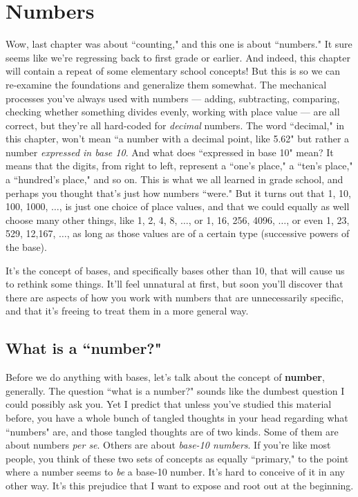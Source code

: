 
\chapter{Numbers}

Wow, last chapter was about ``counting," and this one is about ``numbers."
It sure seems like we're regressing back to first grade or earlier. And
indeed, this chapter will contain a repeat of some elementary school
concepts! But this is so we can re-examine the foundations and generalize
them somewhat. The mechanical processes you've always used with numbers ---
adding, subtracting, comparing, checking whether something divides evenly,
working with place value --- are all correct, but they're all hard-coded
for \textit{decimal} numbers. The word ``decimal," in this chapter, won't
mean ``a number with a decimal point, like 5.62" but rather a number
\textit{expressed in base 10}. And what does ``expressed in base 10" mean?
It means that the digits, from right to left, represent a ``one's place," a
``ten's place," a ``hundred's place," and so on. This is what we all
learned in grade school, and perhaps you thought that's just how numbers
``were." But it turns out that 1, 10, 100, 1000, $\dots$, is just one
choice of place values, and that we could equally as well choose many other
things, like 1, 2, 4, 8, $\dots$, or 1, 16, 256, 4096, $\dots$, or even 1,
23, 529, 12,167, $\dots$, as long as those values are of a certain type
(successive powers of the base).

It's the concept of bases, and specifically bases other than 10, that will
cause us to rethink some things. It'll feel unnatural at first, but soon
you'll discover that there are aspects of how you work with numbers that
are unnecessarily specific, and that it's freeing to treat them in a more
general way.

\section{What is a ``number?"}

Before we do anything with bases, let's talk about the concept of
\textbf{number}, generally. The question ``what is a number?" sounds like
the dumbest question I could possibly ask you. Yet I predict that unless
you've studied this material before, you have a whole bunch of tangled
thoughts in your head regarding what ``numbers" are, and those tangled
thoughts are of two kinds. Some of them are about numbers \textit{per se}.
Others are about \textit{base-10 numbers}. If you're like most people, you
think of these two sets of concepts as equally ``primary," to the point
where a number seems to \textit{be} a base-10 number. It's hard to conceive
of it in any other way.  It's this prejudice that I want to expose and root
out at the beginning.

